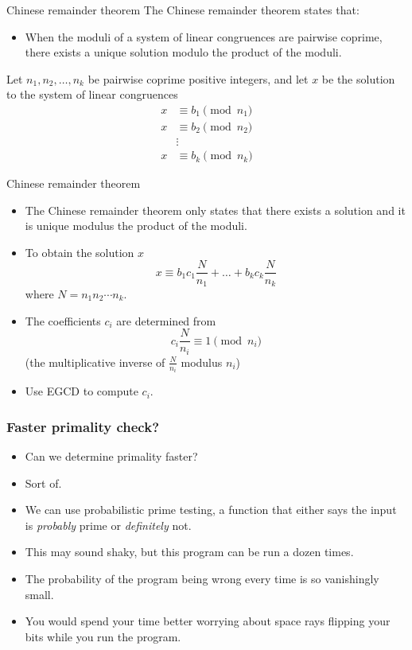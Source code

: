 \documentclass{beamer}
\begin{document}
\begin{frame}[plain]{Chinese remainder theorem}
  \vspace{20pt}
  The Chinese remainder theorem states that:
  \begin{itemize}
    \item When the moduli of a system of linear congruences are pairwise
      coprime, there exists a unique solution modulo the product of the moduli.
  \end{itemize}
  Let $n_1, n_2,\ldots, n_k$ be pairwise coprime positive integers, and let $x$
  be the solution to the system of linear congruences
  \begin{align*}
    x &\equiv  b_1 \pmod{n_1} \\
    x &\equiv  b_2 \pmod{n_2} \\
      &\vdots                 \\
    x &\equiv b_k \pmod{n_k}
  \end{align*}
\end{frame}

\begin{frame}[plain]{Chinese remainder theorem}
  \vspace{10pt}
  \begin{itemize}
    \item The Chinese remainder theorem only states that there exists a solution and it
  is unique modulus the product of the moduli. \\
    \item To obtain the solution $x$
      \[
        x \equiv b_1 c_1 \frac{N}{n_1} + \ldots + b_k c_k \frac{N}{n_k}
      \]
      where $N = n_1 n_2 \cdots n_k$.
    \item The coefficients $c_i$ are determined from
      \[
        c_i \frac{N}{n_i} \equiv 1 \pmod{n_i}
      \]
      (the multiplicative inverse of $\frac{N}{n_i}$ modulus $n_i$)
    \item Use EGCD to compute $c_i$.
  \end{itemize}
\end{frame}



\begin{frame}[plain]
\frametitle{Faster primality check?}

\begin{itemize}
    \item<1-> Can we determine primality faster?
    \item<2-> Sort of.
    \item<3-> We can use probabilistic prime testing, a function that either says the input is \textit{probably} prime or \textit{definitely} not.
    \item<4-> This may sound shaky, but this program can be run a dozen times.
    \item<5-> The probability of the program being wrong every time is so vanishingly small.
    \item<6-> You would spend your time better worrying about space rays flipping your bits while you run the program.
\end{itemize}

\end{frame}
\end{document}
